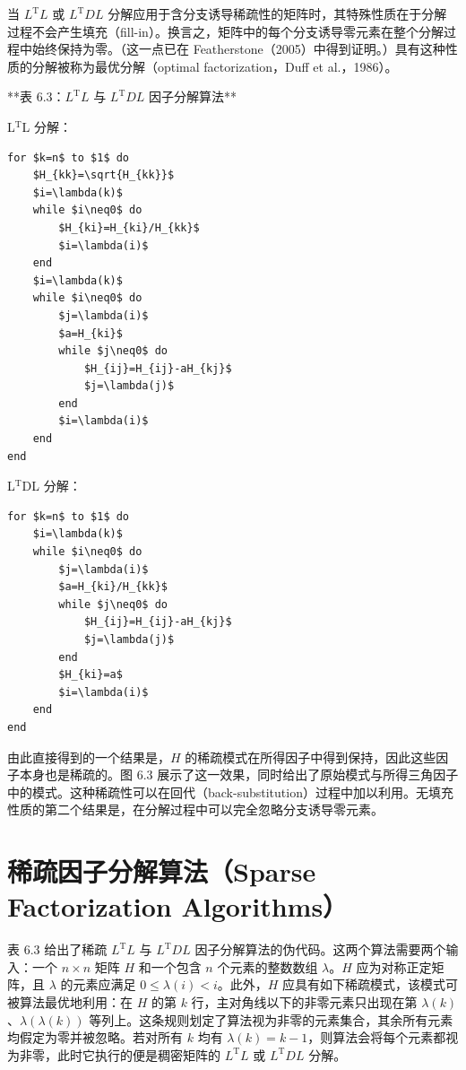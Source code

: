 \documentclass[10pt,a4paper]{book}
\theoremstyle{thmstyle} %
\theoremstyle{defstyle} %
\theoremstyle{prostyle} %
\begin{document}
当 $L^{\mathrm{T}}L$ 或 $L^{\mathrm{T}}DL$ 分解应用于含分支诱导稀疏性的矩阵时，其特殊性质在于分解过程不会产生填充（fill-in）。换言之，矩阵中的每个分支诱导零元素在整个分解过程中始终保持为零。（这一点已在 Featherstone（2005）中得到证明。）具有这种性质的分解被称为最优分解（optimal factorization，Duff et al.，1986）。



**表 6.3：$L^{\mathrm{T}}L$ 与 $L^{\mathrm{T}}DL$ 因子分解算法**



L$^{\mathrm{T}}$L 分解：



\begin{verbatim}
for $k=n$ to $1$ do
    $H_{kk}=\sqrt{H_{kk}}$
    $i=\lambda(k)$
    while $i\neq0$ do
        $H_{ki}=H_{ki}/H_{kk}$
        $i=\lambda(i)$
    end
    $i=\lambda(k)$
    while $i\neq0$ do
        $j=\lambda(i)$
        $a=H_{ki}$
        while $j\neq0$ do
            $H_{ij}=H_{ij}-aH_{kj}$
            $j=\lambda(j)$
        end
        $i=\lambda(i)$
    end
end
\end{verbatim}





L$^{\mathrm{T}}$DL 分解：



\begin{verbatim}
for $k=n$ to $1$ do
    $i=\lambda(k)$
    while $i\neq0$ do
        $j=\lambda(i)$
        $a=H_{ki}/H_{kk}$
        while $j\neq0$ do
            $H_{ij}=H_{ij}-aH_{kj}$
            $j=\lambda(j)$
        end
        $H_{ki}=a$
        $i=\lambda(i)$
    end
end
\end{verbatim}





由此直接得到的一个结果是，$H$ 的稀疏模式在所得因子中得到保持，因此这些因子本身也是稀疏的。图 6.3 展示了这一效果，同时给出了原始模式与所得三角因子中的模式。这种稀疏性可以在回代（back-substitution）过程中加以利用。无填充性质的第二个结果是，在分解过程中可以完全忽略分支诱导零元素。



\section{稀疏因子分解算法（Sparse Factorization Algorithms）}





表 6.3 给出了稀疏 $L^{\mathrm{T}}L$ 与 $L^{\mathrm{T}}DL$ 因子分解算法的伪代码。这两个算法需要两个输入：一个 $n \times n$ 矩阵 $H$ 和一个包含 $n$ 个元素的整数数组 $\lambda$。$H$ 应为对称正定矩阵，且 $\lambda$ 的元素应满足 $0 \leq \lambda(i) < i$。此外，$H$ 应具有如下稀疏模式，该模式可被算法最优地利用：在 $H$ 的第 $k$ 行，主对角线以下的非零元素只出现在第 $\lambda(k)$、$\lambda(\lambda(k))$ 等列上。这条规则划定了算法视为非零的元素集合，其余所有元素均假定为零并被忽略。若对所有 $k$ 均有 $\lambda(k) = k - 1$，则算法会将每个元素都视为非零，此时它执行的便是稠密矩阵的 $L^{\mathrm{T}}L$ 或 $L^{\mathrm{T}}DL$ 分解。
\end{document}
